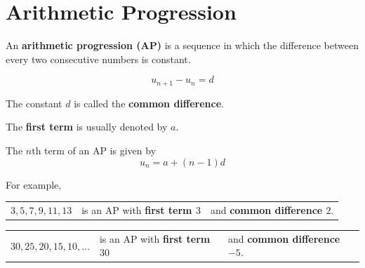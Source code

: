 \documentclass[11pt,a4paper]{book}
\begin{document}
\section{Arithmetic Progression}

\begin{tcolorbox}[colback=blue!5, colframe=black, boxrule=.4pt, sharpish corners]

An \textbf{arithmetic progression (AP)} is a sequence in which the
difference between every two consecutive numbers is constant.

\[
u_{n+1}-u_{n}=d
\]

The constant $d$ is called the \textbf{common difference}.

\medskip{}

The \textbf{first term} is usually denoted by $a$.

\medskip{}

The $n\text{th}$ term of an AP is given by
\[
u_{n}=a+\left(n-1\right)d
\]
\end{tcolorbox}

For example,

\begin{tasks}[label=(\alph*),label-width=3.5ex]

\task  %
\begin{tabular}{>{\raggedright}p{3cm}>{\raggedright}p{4.4cm}>{\raggedright}p{5cm}}
$3,5,7,9,11,13$ & is an AP with \textbf{first term $3$} & and \textbf{common difference $2$}.\tabularnewline
\end{tabular}

\task  %
\begin{tabular}{>{\raggedright}p{3cm}>{\raggedright}p{4.4cm}>{\raggedright}p{5cm}}
$30,25,20,15,10,\ldots$ & is an AP with \textbf{first term $30$} & and \textbf{common difference $-5$}.\tabularnewline
\end{tabular}

\end{tasks}
\end{document}
